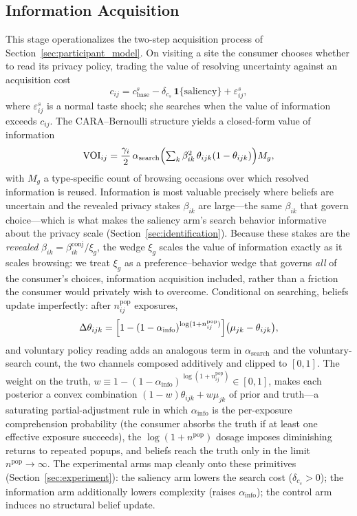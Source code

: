 \documentclass[12pt]{article}
\theoremstyle{definition}
\newcommand{\VOI}{\text{VOI}}
\theoremstyle{remark}
\begin{document}
\subsection{Information Acquisition}

This stage operationalizes the two-step acquisition process of Section~\ref{sec:participant_model}. On visiting a site the consumer chooses whether to read its privacy policy, trading the value of resolving uncertainty against an acquisition cost
\begin{equation*}
  c_{ij} = c^s_{\text{base}} - \delta_{c_s}\,\mathbf{1}\{\text{saliency}\} + \varepsilon^s_{ij},
\end{equation*}
where $\varepsilon^s_{ij}$ is a normal taste shock; she searches when the value of information exceeds $c_{ij}$. The CARA--Bernoulli structure yields a closed-form value of information
\begin{equation}\label{eq:em_voi}
  \VOI_{ij} = \frac{\gamma_i}{2}\, \alpha_{\text{search}} \Bigl(\textstyle\sum_k \beta_{ik}^2\, \theta_{ijk}(1 - \theta_{ijk})\Bigr) M_g,
\end{equation}
with $M_g$ a type-specific count of browsing occasions over which resolved information is reused. Information is most valuable precisely where beliefs are uncertain and the revealed privacy stakes $\beta_{ik}$ are large---the same $\beta_{ik}$ that govern choice---which is what makes the saliency arm's search behavior informative about the privacy scale (Section~\ref{sec:identification}). Because these stakes are the \emph{revealed} $\beta_{ik} = \beta^{\text{conj}}_{ik}/\xi_g$, the wedge $\xi_g$ scales the value of information exactly as it scales browsing: we treat $\xi_g$ as a preference--behavior wedge that governs \emph{all} of the consumer's choices, information acquisition included, rather than a friction the consumer would privately wish to overcome. Conditional on searching, beliefs update imperfectly: after $n^{\text{pop}}_{ij}$ exposures,
\begin{equation}\label{eq:em_update}
  \Delta\theta_{ijk} = \Bigl[1 - (1 - \alpha_{\text{info}})^{\log(1 + n^{\text{pop}}_{ij})}\Bigr]\bigl(\mu_{jk} - \theta_{ijk}\bigr),
\end{equation}
and voluntary policy reading adds an analogous term in $\alpha_{\text{search}}$ and the voluntary-search count, the two channels composed additively and clipped to $[0,1]$. The weight on the truth, $w \equiv 1 - (1-\alpha_{\text{info}})^{\log(1 + n^{\text{pop}}_{ij})} \in [0,1]$, makes each posterior a convex combination $(1-w)\theta_{ijk} + w\mu_{jk}$ of prior and truth---a saturating partial-adjustment rule in which $\alpha_{\text{info}}$ is the per-exposure comprehension probability (the consumer absorbs the truth if at least one effective exposure succeeds), the $\log(1+n^{\text{pop}})$ dosage imposes diminishing returns to repeated popups, and beliefs reach the truth only in the limit $n^{\text{pop}} \to \infty$. The experimental arms map cleanly onto these primitives (Section~\ref{sec:experiment}): the saliency arm lowers the search cost ($\delta_{c_s} > 0$); the information arm additionally lowers complexity (raises $\alpha_{\text{info}}$); the control arm induces no structural belief update.
\end{document}
